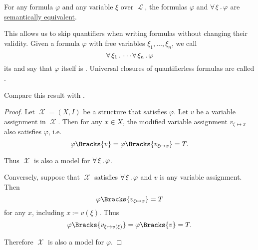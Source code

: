\begin{proposition}\label{thm:semantic_implicit_universal_quantification}
  For any formula \( \varphi \) and any variable \( \xi \) over \( \mscrL \), the formulas \( \varphi \) and \( \forall \thinspace \xi \thinspace . \thinspace \varphi \) are \hyperref[def:first_order_semantics/equivalence]{semantically equivalent}.

  This allows us to skip quantifiers when writing formulas without changing their validity. Given a formula \( \varphi \) with free variables \( \xi_1, \ldots, \xi_n \), we call
  \begin{equation*}
    \forall \thinspace \xi_1 \thinspace . \thinspace \cdots \forall \thinspace \xi_n \thinspace . \thinspace \varphi
  \end{equation*}
  its  and say that \( \varphi \) itself is . Universal closures of quantifierless formulas are called .

  Compare this result with .
\end{proposition}
\begin{proof}
  Let \( \mscrX = (X, I) \) be a structure that satisfies \( \varphi \). Let \( v \) be a variable assignment in \( \mscrX \). Then for any \( x \in X \), the modified variable assignment \( v_{\xi \mapsto x} \) also satisfies \( \varphi \), i.e.
  \begin{equation*}
    \varphi\Bracks{v} = \varphi\Bracks{v_{\xi \mapsto x}} = T.
  \end{equation*}

  Thus \( \mscrX \) is also a model for \( \forall \thinspace \xi \thinspace . \thinspace \varphi \).

  Conversely, suppose that \( \mscrX \) satisfies \( \forall \thinspace \xi \thinspace . \thinspace \varphi \) and \( v \) is any variable assignment. Then
  \begin{equation*}
    \varphi\Bracks{v_{\xi \mapsto x}} = T
  \end{equation*}
  for any \( x \), including \( x \coloneqq v(\xi) \). Thus
  \begin{equation*}
    \varphi\Bracks{v_{\xi \mapsto v(\xi)}} = \varphi\Bracks{v} = T.
  \end{equation*}

  Therefore \( \mscrX \) is also a model for \( \varphi \).
\end{proof}

